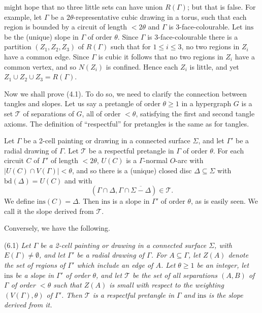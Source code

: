 \noindent might hope that no three little sets can have union $R(\Gamma)$; but that is false. For example, let $\Gamma$ be a $2\theta$-representative cubic drawing in a torus, such that each region is bounded by a circuit of length $< 2\theta$ and $\Gamma$ is 3-face-colourable. Let $\text{ins}$ be the (unique) slope in $\Gamma$ of order $\theta$. Since $\Gamma$ is 3-face-colourable there is a partition $(Z_1, Z_2, Z_3)$ of $R(\Gamma)$ such that for $1 \le i \le 3$, no two regions in $Z_i$ have a common edge. Since $\Gamma$ is cubic it follows that no two regions in $Z_i$ have a common vertex, and so $N(Z_i)$ is confined. Hence each $Z_i$ is little, and yet $Z_1 \cup Z_2 \cup Z_3 = R(\Gamma)$.


Now we shall prove (4.1). To do so, we need to clarify the connection between tangles and slopes. Let us say a pretangle of order $\theta \ge 1$ in a hypergraph $G$ is a set $\mathscr{T}$ of separations of $G$, all of order $< \theta$, satisfying the first and second tangle axioms. The definition of ``respectful'' for pretangles is the same as for tangles.

Let $\Gamma$ be a 2-cell painting or drawing in a connected surface $\Sigma$, and let $\Gamma'$ be a radial drawing of $\Gamma$. Let $\mathscr{T}$ be a respectful pretangle in $\Gamma$ of order $\theta$. For each circuit $C$ of $\Gamma'$ of length $< 2\theta$, $U(C)$ is a $\Gamma$-normal $O$-arc with $|U(C) \cap V(\Gamma)| < \theta$, and so there is a (unique) closed disc $\Delta \subseteq \Sigma$ with $\text{bd}(\Delta) = U(C)$ and with
\begin{equation*}
(\Gamma \cap \Delta, \Gamma \cap \overline{\Sigma - \Delta}) \in \mathscr{T}.
\end{equation*}
We define $\text{ins}(C) = \Delta$. Then $\text{ins}$ is a slope in $\Gamma'$ of order $\theta$, as is easily seen. We call it the slope derived from $\mathscr{T}$.

Conversely, we have the following.

\stmt
(6.1) \textit{Let $\Gamma$ be a 2-cell painting or drawing in a connected surface $\Sigma$, with $E(\Gamma) \ne \emptyset$, and let $\Gamma'$ be a radial drawing of $\Gamma$. For $A \subseteq \Gamma$, let $Z(A)$ denote the set of regions of $\Gamma'$ which include an edge of $A$. Let $\theta \ge 1$ be an integer, let $\text{ins}$ be a slope in $\Gamma'$ of order $\theta$, and let $\mathscr{T}$ be the set of all separations $(A, B)$ of $\Gamma$ of order $< \theta$ such that $Z(A)$ is small with respect to the weighting $(V(\Gamma), \theta)$ of $\Gamma'$. Then $\mathscr{T}$ is a respectful pretangle in $\Gamma$ and $\text{ins}$ is the slope derived from it.}


